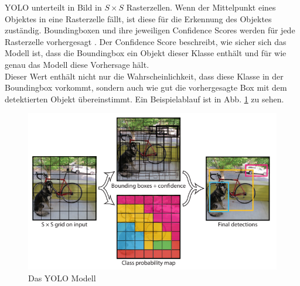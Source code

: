 {{	YOLO unterteilt in Bild in $S \times S $ Rasterzellen. Wenn der Mittelpunkt eines Objektes in eine Rasterzelle fällt, ist diese für die Erkennung des Objektes zuständig. Boundingboxen und ihre jeweiligen Confidence Scores werden für jede Rasterzelle vorhergesagt \citep{Redmon2016}.
	Der Confidence Score beschreibt, wie sicher sich das Modell ist, dass die Boundingbox ein Objekt dieser Klasse enthält und für wie genau das Modell diese Vorhersage hält. \\
	Dieser Wert enthält nicht nur die Wahrscheinlichkeit, dass diese Klasse in der Boundingbox vorkommt, sondern auch wie gut die vorhergesagte Box mit dem detektierten Objekt übereinstimmt. Ein Beispielablauf ist in Abb. \ref{YOLO_Model} zu sehen.
	\begin{figure}[ht]
		\centering
		\includegraphics*[scale = 2, keepaspectratio, trim=2 2 2 2 ]{images/YOLO/YOLO_model.png}
		\caption[Das YOLO Modell]{Das YOLO Modell\citep{Redmon2016}}
		\label{YOLO_Model}
 	\end{figure}

	


}}
